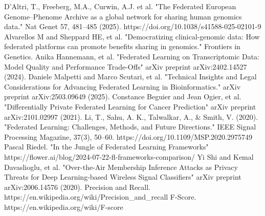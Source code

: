 \documentclass[conference]{IEEEtran}
\begin{document}
\begin{thebibliography}{00}
 D’Altri, T., Freeberg, M.A., Curwin, A.J. et al. "The Federated European Genome–Phenome Archive as a global network for sharing human genomics data." Nat Genet 57, 481–485 (2025). https://doi.org/10.1038/s41588-025-02101-9
 Alvarellos M and Sheppard HE, et al. "Democratizing clinical-genomic data: How federated platforms can promote benefits sharing in genomics." Frontiers in Genetics.
 Anika Hannemann, et al. "Federated Learning on Transcriptomic Data: Model Quality and Performance Trade-Offs" arXiv preprint arXiv:2402.14527 (2024).
 Daniele Malpetti and Marco Scutari, et al. "Technical Insights and Legal Considerations for Advancing Federated Learning in Bioinformatics." arXiv preprint arXiv:2503.09649 (2025).
 Constance Beguier and Jean Ogier, et al. "Differentially Private Federated Learning for Cancer Prediction" arXiv preprint arXiv:2101.02997 (2021).
 Li, T., Sahu, A. K., Talwalkar, A., \& Smith, V. (2020). "Federated Learning: Challenges, Methods, and Future Directions." IEEE Signal Processing Magazine, 37(3), 50–60. https://doi.org/10.1109/MSP.2020.2975749
 Pascal Riedel. "In the Jungle of Federated Learning Frameworks" https://flower.ai/blog/2024-07-22-fl-frameworks-comparison/
 Yi Shi and Kemal Davaslioglu, et al. "Over-the-Air Membership Inference Attacks as Privacy Threats for Deep Learning-based Wireless Signal Classifiers" arXiv preprint arXiv:2006.14576 (2020).
 Precision and Recall. https://en.wikipedia.org/wiki/Precision\_and\_recall
 F-Score. https://en.wikipedia.org/wiki/F-score
\end{thebibliography}
\end{document}
